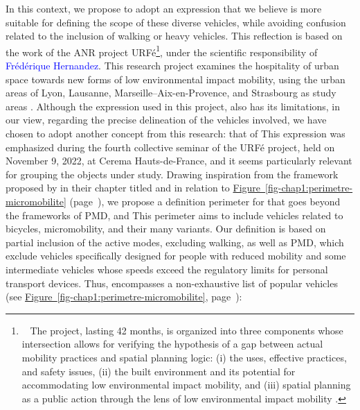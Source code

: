 \begin{refsegment}
In this context, we propose to adopt an expression that we believe is more suitable for defining the scope of these diverse vehicles, while avoiding confusion related to the inclusion of walking or heavy vehicles. This reflection is based on the work of the ANR project \acrfull{URFé}\footnote{~
    The project, lasting 42 months, is organized into three components whose intersection allows for verifying the hypothesis of a gap between actual mobility practices and spatial planning logic: (i) the uses, effective practices, and safety issues, (ii) the built environment and its potential for accommodating low environmental impact mobility, and (iii) spatial planning as a public action through the lens of low environmental impact mobility \textcolor{blue}{\autocite{urfe_projet_2022}}.
}, under the scientific responsibility of \textcolor{blue}{Frédérique Hernandez}. This research project examines the hospitality of urban space towards new forms of low environmental impact mobility, using the urban areas of Lyon, Lausanne, Marseille–Aix-en-Provence, and Strasbourg as study areas \textcolor{blue}{\autocite{urfe_projet_2022}}. Although the expression  used in this project, also has its limitations, in our view, regarding the precise delineation of the vehicles involved, we have chosen to adopt another concept from this research: that of  This expression was emphasized during the fourth collective seminar of the \acrshort{URFé} project, held on November 9, 2022, at \acrshort{Cerema} Hauts-de-France, and it seems particularly relevant for grouping the objects under study. Drawing inspiration from the framework proposed by \textcolor{blue}{\textcite[61]{rabaud_quand_2022}} in their chapter titled  and in relation to \hyperref[fig-chap1:perimetre-micromobilite]{Figure~\ref{fig-chap1:perimetre-micromobilite}} (page~\pageref{fig-chap1:perimetre-micromobilite}), we propose a definition perimeter for  that goes beyond the frameworks of  \acrshort{PMD},  and  This perimeter aims to include vehicles related to bicycles, micromobility, and their many variants. Our definition is based on partial inclusion of the \gls{active modes}, excluding walking, as well as \acrshort{PMD}, which exclude vehicles specifically designed for people with reduced mobility and some intermediate vehicles whose speeds exceed the regulatory limits for personal transport devices. Thus,  encompasses a non-exhaustive list of popular vehicles (see \hyperref[fig-chap1:perimetre-micromobilite]{Figure~\ref{fig-chap1:perimetre-micromobilite}}, page~\pageref{fig-chap1:perimetre-micromobilite}):

\end{refsegment}
